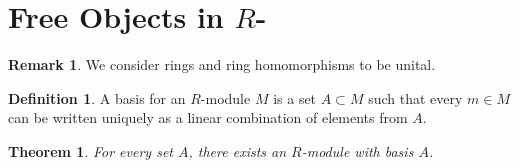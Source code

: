\documentclass[12pt]{article}
\theoremstyle{definition}
\newtheorem{definition}{Definition}[section]
\newtheorem{remark}{Remark}[section]
\theoremstyle{plain}
\newtheorem{theorem}{Theorem}[section]
\numberwithin{equation}{section}
\theoremstyle{definition}
\begin{document}
\section{Free Objects in $ R $-}
\begin{remark}
We consider rings and ring homomorphisms to be unital.
\end{remark}

\begin{definition}
A basis for an $ R $-module $ M $ is a set $ A \subset M $ such that every $ m \in M $ can be written uniquely as a linear combination of elements from $ A $.
\end{definition}

\begin{theorem}
For every set $ A $, there exists an $ R $-module with basis $ A $.
\end{theorem}
\end{document}
